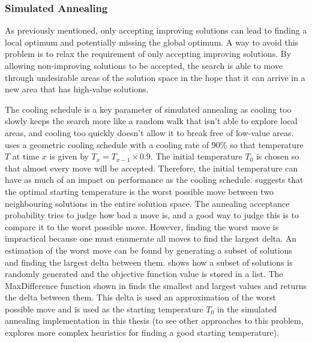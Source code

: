 \subsubsection{Simulated Annealing} \label{simulated_annealing}

As previously mentioned, only accepting improving solutions can lead to finding a local optimum and potentially missing the global optimum. A way to avoid this problem is to relax the requirement of only accepting improving solutions. By allowing non-improving solutions to be accepted, the search is able to move through undesirable areas of the solution space in the hope that it can arrive in a new area that has high-value solutions.

The cooling schedule is a key parameter of simulated annealing as cooling too slowly keeps the search more like a random walk that isn't able to explore local areas, and cooling too quickly doesn't allow it to break free of low-value areas. \citet{kirkpatrick1983optimization} uses a geometric cooling schedule with a cooling rate of 90\% so that temperature $T$ at time $x$ is given by $T_x = T_{x-1} \times 0.9$. The initial temperature $T_0$ is chosen so that almost every move will be accepted. Therefore, the initial temperature can have as much of an impact on performance as the cooling schedule. \citet{kirkpatrick1983optimization} suggests that the optimal starting temperature is the worst possible move between two neighbouring solutions in the entire solution space. The annealing acceptance probability tries to judge how bad a move is, and a good way to judge this is to compare it to the worst possible move. However, finding the worst move is impractical because one must enumerate all moves to find the largest delta. An estimation of the worst move can be found by generating a subset of solutions and finding the largest delta between them.  shows how a subset of solutions is randomly generated and the objective function value is stored in a list. The MaxDifference function shown in  finds the smallest and largest values and returns the delta between them. This delta is used an approximation of the worst possible move and is used as the starting temperature $T_0$ in the simulated annealing implementation in this thesis (to see other approaches to this problem, \citet{ben2004computing} explores more complex heuristics for finding a good starting temperature).

